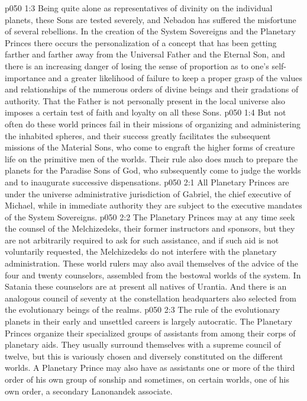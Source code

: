 \vs p050 1:3 Being quite alone as representatives of divinity on the individual planets, these Sons are tested severely, and Nebadon has suffered the misfortune of several rebellions. In the creation of the System Sovereigns and the Planetary Princes there occurs the personalization of a concept that has been getting farther and farther away from the Universal Father and the Eternal Son, and there is an increasing danger of losing the sense of proportion as to one’s self\hyp{}importance and a greater likelihood of failure to keep a proper grasp of the values and relationships of the numerous orders of divine beings and their gradations of authority. That the Father is not personally present in the local universe also imposes a certain test of faith and loyalty on all these Sons.\plusone
\vs p050 1:4 But not often do these world princes fail in their missions of organizing and administering the inhabited spheres, and their success greatly facilitates the subsequent missions of the Material Sons, who come to engraft the higher forms of creature life on the primitive men of the worlds. Their rule also does much to prepare the planets for the Paradise Sons of God, who subsequently come to judge the worlds and to inaugurate successive dispensations.
\vs p050 2:1 All Planetary Princes are under the universe administrative jurisdiction of Gabriel, the chief executive of Michael, while in immediate authority they are subject to the executive mandates of the System Sovereigns.
\vs p050 2:2 The Planetary Princes may at any time seek the counsel of the Melchizedeks, their former instructors and sponsors, but they are not arbitrarily required to ask for such assistance, and if such aid is not voluntarily requested, the Melchizedeks do not interfere with the planetary administration. These world rulers may also avail themselves of the advice of the four and twenty counselors, assembled from the bestowal worlds of the system. In Satania these counselors are at present all natives of Urantia. And there is an analogous council of seventy at the constellation headquarters also selected from the evolutionary beings of the realms.\plusone
\vs p050 2:3 The rule of the evolutionary planets in their early and unsettled careers is largely autocratic. The Planetary Princes organize their specialized groups of assistants from among their corps of planetary aids. They usually surround themselves with a supreme council of twelve, but this is variously chosen and diversely constituted on the different worlds. A Planetary Prince may also have as assistants one or more of the third order of his own group of sonship and sometimes, on certain worlds, one of his own order, a secondary Lanonandek associate.
